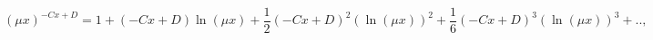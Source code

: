 \begin{equation}
(\mu x)^{-Cx+D}=1+(-Cx+D)\ln(\mu x)+\frac{1}{2}(-Cx+D)^{2}(\ln(\mu
x))^{2}+\frac{1}{6}(-Cx+D)^{3}(\ln(\mu x))^{3}+..,
\end{equation}

